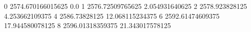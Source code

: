 0 2574.670166015625 0.0
1 2576.72509765625 2.054931640625
2 2578.923828125 4.253662109375
4 2586.73828125 12.068115234375
6 2592.61474609375 17.944580078125
8 2596.01318359375 21.343017578125
